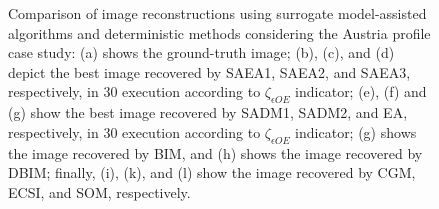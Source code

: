 \begin{figure}[!h]
				\caption[Austria profile case study: Comparison of image reconstructions using surrogate model-assisted algorithms and deterministic methods.]{Comparison of image reconstructions using surrogate model-assisted algorithms and deterministic methods considering the Austria profile case study: (a) shows the ground-truth image; (b), (c), and (d) depict the best image recovered by SAEA1, SAEA2, and SAEA3, respectively, in 30 execution according to $\zeta_{\epsilon OE}$ indicator; (e), (f) and (g) show the best image recovered by SADM1, SADM2, and EA, respectively, in 30 execution according to $\zeta_{\epsilon OE}$ indicator; (g) shows the image recovered by BIM, and (h) shows the image recovered by DBIM; finally, (i), (k), and (l) show the image recovered by CGM, ECSI, and SOM, respectively.}
				\label{fig:results:casestudy:austria:reconstruction}
			\end{figure}
		
			
